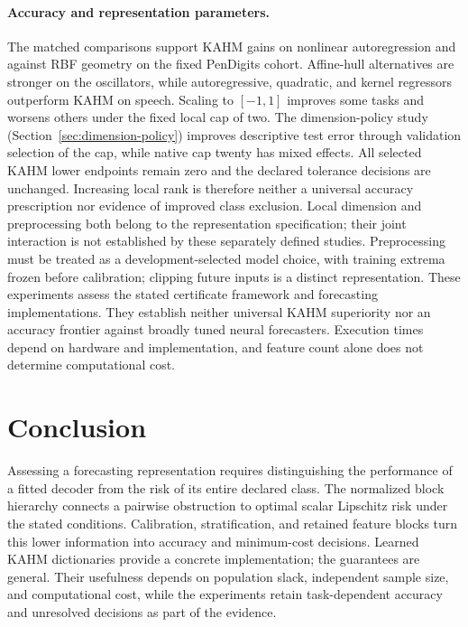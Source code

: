 \paragraph{Accuracy and representation parameters.}
The matched comparisons support KAHM gains on nonlinear autoregression and
against RBF geometry on the fixed PenDigits cohort. Affine-hull alternatives
are stronger on the oscillators, while autoregressive, quadratic, and kernel
regressors outperform KAHM on speech. Scaling to $[-1,1]$ improves some tasks
and worsens others under the fixed local cap of two.
The dimension-policy study (Section~\ref{sec:dimension-policy}) improves
descriptive test error through validation selection of the cap, while native
cap twenty has mixed effects. All selected KAHM lower endpoints remain zero
and the declared tolerance decisions are unchanged. Increasing local rank is
therefore neither a universal accuracy prescription nor evidence of improved
class exclusion. Local dimension and preprocessing both belong to the
representation specification; their joint interaction is not established by
these separately defined studies.
Preprocessing must be treated as a development-selected model choice,
with training extrema frozen before calibration; clipping future inputs is
a distinct representation. These experiments assess the stated certificate
framework and forecasting implementations. They establish neither universal
KAHM superiority nor an accuracy frontier against broadly tuned neural
forecasters. Execution times depend on hardware and implementation, and
feature count alone does not determine computational cost.

\section{Conclusion}

Assessing a forecasting representation requires distinguishing the performance
of a fitted decoder from the risk of its entire declared class. The normalized
block hierarchy connects a pairwise obstruction to optimal scalar Lipschitz
risk under the stated conditions. Calibration, stratification, and retained
feature blocks turn this lower information into accuracy and minimum-cost
decisions. Learned KAHM dictionaries provide a concrete implementation;
the guarantees are general. Their usefulness depends on population slack,
independent sample size, and computational cost, while the experiments retain
task-dependent accuracy and unresolved decisions as part of the evidence.
